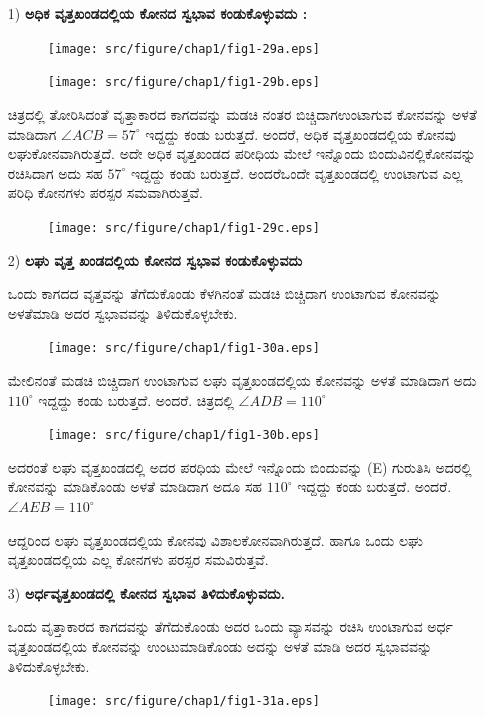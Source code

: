   \eject
    \begin{itemize}
  \item[1)] \textbf{ಅಧಿಕ ವೃತ್ತಖಂಡದಲ್ಲಿಯ ಕೋನದ ಸ್ವಭಾವ ಕಂಡುಕೊಳ್ಳುವದು :}
  \begin{figure}[H]
\centering
\texttt{[image: src/figure/chap1/fig1-29a.eps]}
\end{figure}
\begin{figure}[H]
\centering
\texttt{[image: src/figure/chap1/fig1-29b.eps]}
\end{figure}
 
 ಚಿತ್ರದಲ್ಲಿ ತೋರಿಸಿದಂತೆ ವೃತ್ತಾಕಾರದ ಕಾಗದವನ್ನು ಮಡಚಿ ನಂತರ ಬಿಚ್ಚಿದಾಗ\break ಉಂಟಾಗುವ ಕೋನವನ್ನು ಅಳತೆ ಮಾಡಿದಾಗ $\angle ACB = 57^\circ$ ಇದ್ದದ್ದು ಕಂಡು ಬರುತ್ತದೆ. ಅಂದರೆ, ಅಧಿಕ ವೃತ್ತಖಂಡದಲ್ಲಿಯ ಕೋನವು ಲಘುಕೋನವಾಗಿರುತ್ತದೆ. ಅದೇ ಅಧಿಕ ವೃತ್ತಖಂಡದ ಪರೀಧಿಯ ಮೇಲೆ ಇನ್ನೊಂದು ಬಿಂದುವಿನಲ್ಲಿ\break ಕೋನವನ್ನು ರಚಿಸಿದಾಗ ಅದು ಸಹ $57^\circ$ ಇದ್ದದ್ದು ಕಂಡು ಬರುತ್ತದೆ. ಅಂದರೆ\break ಒಂದೇ ವೃತ್ತಖಂಡದಲ್ಲಿ ಉಂಟಾಗುವ ಎಲ್ಲ ಪರಿಧಿ ಕೋನಗಳು ಪರಸ್ಪರ ಸಮ\break ವಾಗಿರುತ್ತವೆ. 
 \begin{figure}[H]
\centering
\texttt{[image: src/figure/chap1/fig1-29c.eps]}
\end{figure}

 \item[2)] \textbf{ಲಘು ವೃತ್ತ ಖಂಡದಲ್ಲಿಯ ಕೋನದ ಸ್ವಭಾವ ಕಂಡುಕೊಳ್ಳುವದು} 
 
 ಒಂದು ಕಾಗದದ ವೃತ್ತವನ್ನು ತೆಗೆದುಕೊಂಡು ಕೆಳಗಿನಂತೆ ಮಡಚಿ ಬಿಚ್ಚಿದಾಗ ಉಂಟಾಗುವ ಕೋನವನ್ನು ಅಳತೆಮಾಡಿ ಅದರ ಸ್ವಭಾವವನ್ನು ತಿಳಿದುಕೊಳ್ಳಬೇಕು. 
 \begin{figure}[H]
\centering
\texttt{[image: src/figure/chap1/fig1-30a.eps]}
\end{figure}
 
 ಮೇಲಿನಂತೆ ಮಡಚಿ ಬಿಚ್ಚಿದಾಗ ಉಂಟಾಗುವ ಲಘು ವೃತ್ತಖಂಡದಲ್ಲಿಯ ಕೋನವನ್ನು ಅಳತೆ ಮಾಡಿದಾಗ ಅದು $110^\circ$ ಇದ್ದದ್ದು ಕಂಡು ಬರುತ್ತದೆ. ಅಂದರೆ. ಚಿತ್ರದಲ್ಲಿ  $\angle ADB = 110^\circ$
  \begin{figure}[H]
\centering
\texttt{[image: src/figure/chap1/fig1-30b.eps]}
\end{figure}
 
 ಅದರಂತೆ ಲಘು ವೃತ್ತಖಂಡದಲ್ಲಿ ಅದರ ಪರಧಿಯ ಮೇಲೆ ಇನ್ನೊಂದು ಬಿಂದುವನ್ನು (E) ಗುರುತಿಸಿ ಅದರಲ್ಲಿ ಕೋನವನ್ನು ಮಾಡಿಕೊಂಡು ಅಳತೆ ಮಾಡಿದಾಗ ಅದೂ ಸಹ  $110^\circ$ ಇದ್ದದ್ದು ಕಂಡು ಬರುತ್ತದೆ. ಅಂದರೆ.  $\angle AEB = 110^\circ$
 
 ಆದ್ದರಿಂದ ಲಘು ವೃತ್ತಖಂಡದಲ್ಲಿಯ ಕೋನವು ವಿಶಾಲಕೋನವಾಗಿರುತ್ತದೆ. ಹಾಗೂ ಒಂದು ಲಘು ವೃತ್ತಖಂಡದಲ್ಲಿಯ ಎಲ್ಲ ಕೋನಗಳು ಪರಸ್ಪರ ಸಮವಿರುತ್ತವೆ.  
 
  \item[3)] \textbf{ಅರ್ಧವೃತ್ತಖಂಡದಲ್ಲಿ ಕೋನದ ಸ್ವಭಾವ ತಿಳಿದುಕೊಳ್ಳುವದು.}
  
  ಒಂದು ವೃತ್ತಾಕಾರದ ಕಾಗದವನ್ನು  ತೆಗೆದುಕೊಂಡು ಅದರ ಒಂದು ವ್ಯಾಸವನ್ನು ರಚಿಸಿ ಉಂಟಾಗುವ ಅರ್ಧ ವೃತ್ತಖಂಡದಲ್ಲಿಯ ಕೋನವನ್ನು ಉಂಟುಮಾಡಿ\break ಕೊಂಡು ಅದನ್ನು ಅಳತೆ ಮಾಡಿ ಅದರ ಸ್ವಭಾವವನ್ನು ತಿಳಿದುಕೊಳ್ಳಬೇಕು. 
\begin{figure}[H]
\centering
\texttt{[image: src/figure/chap1/fig1-31a.eps]}
\end{figure}
 

\end{itemize}
